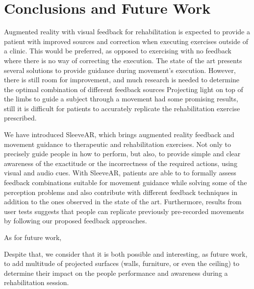 \chapter{Conclusions and Future Work}
\label{sec:conclusions}


Augmented reality with visual feedback for rehabilitation is expected to provide a patient with improved sources and correction when executing exercises outside of a clinic. 
This would be preferred, as opposed to exercising with no feedback where there is no way of correcting the execution.
The state of the art presents several solutions to provide guidance during movement's execution.
However, there is still room for improvement, and much research is needed to determine the optimal combination of different feedback sources
Projecting light on top of the limbs to guide a subject through a movement had some promising results, still it is difficult for patients to accurately replicate the rehabilitation exercise prescribed.

We have introduced SleeveAR, which brings augmented reality feedback and movement guidance to therapeutic and rehabilitation exercises. Not only to precisely guide people in how to perform, but also, to provide simple and clear awareness of the exactitude or the incorrectness of the required actions, using visual and audio cues.
With SleeveAR, patients are able to to formally assess feedback combinations suitable for movement guidance while solving some of the perception problems and also contribute with different feedback techniques in addition to the ones observed in the state of the art.
Furthermore, results from user tests suggests that people can replicate previously pre-recorded movements by following our proposed feedback approaches.

As for future work, 



Despite that, we consider that it is both possible and interesting, as future work, to add multitude of projected surfaces (walls, furniture, or even the ceiling)  to determine their impact on the people performance and awareness during a rehabilitation session.